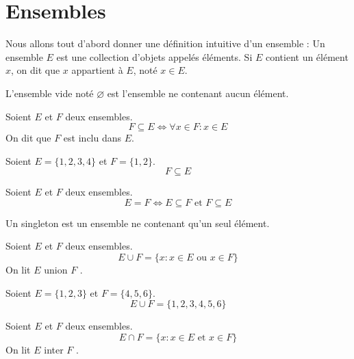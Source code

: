 \chapter{Ensembles}
\def\arraystretch{1}

Nous allons tout d'abord donner une définition intuitive d'un ensemble : Un ensemble $E$ est une collection d'objets appelés éléments. Si $E$ contient un élément $x$, on dit que $x$ appartient à $E$, noté $x \in E$.

\begin{definition}
  L'ensemble vide noté $\varnothing$ est l'ensemble ne contenant aucun élément.
\end{definition}

\begin{definition}[Inclusion]
  Soient $E$ et $F$ deux ensembles.
  $$F \subseteq E \iff \forall x \in F : x \in E$$
  On dit que $F$ est inclu dans $E$.
\end{definition}

\begin{example}
	Soient $E = \{1, 2, 3, 4\}$ et $F = \{1, 2\}$.
	\[F \subseteq E\]
\end{example}

\begin{definition}
  Soient $E$ et $F$ deux ensembles.
  $$E = F \iff E \subseteq F \text{ et } F \subseteq E$$
\end{definition}

\begin{definition}[Singleton]
  Un singleton est un ensemble ne contenant qu'un seul élément.
\end{definition}

\begin{definition}
  Soient $E$ et $F$ deux ensembles.
  \[ E \cup F = \{ x : x \in E \text{ ou } x \in F \} \]
  On lit \og $E$ union $F$ \fg.
\end{definition}

\begin{example}
	Soient $E = \{ 1, 2, 3 \}$ et $F = \{ 4, 5, 6 \}$.
	\[ E \cup F = \{ 1, 2, 3, 4, 5, 6 \} \]
\end{example}

\begin{definition}
  Soient $E$ et $F$ deux ensembles.
  \[ E \cap F = \{ x : x \in E \text{ et } x \in F \} \]
  On lit \og $E$ inter $F$ \fg.
\end{definition}

